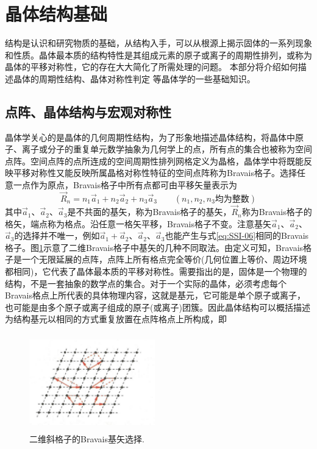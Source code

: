 \section{晶体结构基础}
结构是认识和研究物质的基础，从结构入手，可以从根源上揭示固体的一系列现象和性质。晶体最本质的结构特性是其组成元素的原子或离子的周期性排列，或称为晶体的平移对称性，它的存在大大简化了所需处理的问题。%
本部分将介绍如何描述晶体的周期性结构、晶体对称性判定%
等晶体学的一些基础知识。

\subsection{点阵、晶体结构与宏观对称性}
晶体学关心的是晶体的几何周期性结构，为了形象地描述晶体结构，将晶体中原子、离子或分子的重复单元数学抽象为几何学上的点，所有点的集合也被称为空间点阵。空间点阵的点所连成的空间周期性排列网格定义为晶格，晶体学中将既能反映平移对称性又能反映所属晶格对称性特征的空间点阵称为Bravais格子。选择任意一点作为原点，Bravais格子中所有点都可由平移矢量表示为
\begin{equation}
	\vec R_n=n_1\vec a_1+n_2\vec a_2+n_3\vec a_3\qquad (n_1,n_2,n_3\mbox{均为整数})
	\label{eq:SSI-06}
\end{equation}
其中$\vec a_1$、$\vec a_2$、$\vec a_3$是不共面的基矢，称为Bravais格子的基矢，$\vec R_n$称为Bravais格子的格矢，端点称为格点。沿任意一格矢平移，Bravais格子不变。注意基矢$\vec a_1$、$\vec a_2$、$\vec a_3$的选择并不唯一，例如$\vec a_1+\vec a_2$、$\vec a_2$、$\vec a_3$也能产生与式\eqref{eq:SSI-06}相同的Bravais格子。图\ref{Fig:Bravais_Lattice-basis}示意了二维Bravais格子中基矢的几种不同取法。由定义可知，Bravais格子是一个无限延展的点阵，点阵上所有格点完全等价(几何位置上等价、周边环境都相同)，它代表了晶体最本质的平移对称性。需要指出的是，固体是一个物理的结构，不是一套抽象的数学点的集合。对于一个实际的晶体，必须考虑每个Bravais格点上所代表的具体物理内容，这就是基元，它可能是单个原子或离子，也可能是由多个原子或离子组成的原子(或离子)团簇。因此晶体结构可以概括描述为结构基元以相同的方式重复放置在点阵格点上所构成，即
\begin{figure}[h!]
\centering
\vspace*{-0.05in}
\includegraphics[height=1.65in,width=2.15in,viewport=0 0 45 30,clip]{Figures/Bravais_Lattice-basis_set.png}
\caption{\small \textrm{二维斜格子的Bravais基矢选择.}}%
\label{Fig:Bravais_Lattice-basis}
\end{figure}
